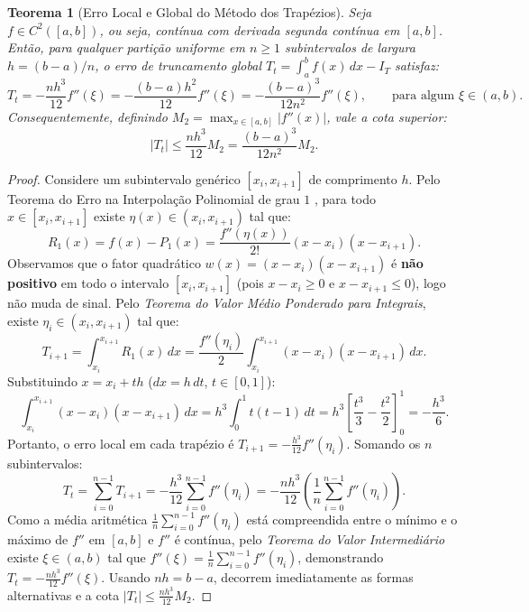 \documentclass[11pt,a4paper]{article}
\newtheorem{teorema}{Teorema}[section]
\begin{document}
\begin{teorema}[Erro Local e Global do Método dos Trapézios]
Seja $f \in C^2([a, b])$, ou seja, contínua com derivada segunda contínua em $[a, b]$. Então, para qualquer partição uniforme em $n \ge 1$ subintervalos de largura $h = (b - a)/n$, o erro de truncamento global $T_t = \int_a^b f(x)\,dx - I_T$ satisfaz:
\begin{equation}
    T_t = -\frac{n h^3}{12} f''(\xi) = -\frac{(b - a) h^2}{12} f''(\xi) = -\frac{(b - a)^3}{12 n^2} f''(\xi), \qquad \text{para algum } \xi \in (a, b).
\end{equation}
Consequentemente, definindo $M_2 = \max_{x \in [a, b]} |f''(x)|$, vale a cota superior:
\begin{equation}
    |T_t| \le \frac{n h^3}{12} M_2 = \frac{(b - a)^3}{12 n^2} M_2.
\end{equation}
\end{teorema}

\begin{proof}
Considere um subintervalo genérico $[x_i, x_{i+1}]$ de comprimento $h$. Pelo Teorema do Erro na Interpolação Polinomial de grau $1$ \cite{burden2016, ruggiero1996}, para todo $x \in [x_i, x_{i+1}]$ existe $\eta(x) \in (x_i, x_{i+1})$ tal que:
\[
R_1(x) = f(x) - P_1(x) = \frac{f''(\eta(x))}{2!} (x - x_i)(x - x_{i+1}).
\]
Observamos que o fator quadrático $w(x) = (x - x_i)(x - x_{i+1})$ é \textbf{não positivo} em todo o intervalo $[x_i, x_{i+1}]$ (pois $x - x_i \ge 0$ e $x - x_{i+1} \le 0$), logo não muda de sinal. Pelo \emph{Teorema do Valor Médio Ponderado para Integrais}, existe $\eta_i \in (x_i, x_{i+1})$ tal que:
\[
T_{i+1} = \int_{x_i}^{x_{i+1}} R_1(x)\,dx = \frac{f''(\eta_i)}{2} \int_{x_i}^{x_{i+1}} (x - x_i)(x - x_{i+1})\,dx.
\]
Substituindo $x = x_i + t h$ ($dx = h\,dt$, $t \in [0, 1]$):
\[
\int_{x_i}^{x_{i+1}} (x - x_i)(x - x_{i+1})\,dx = h^3 \int_0^1 t(t - 1)\,dt = h^3 \left[\frac{t^3}{3} - \frac{t^2}{2}\right]_0^1 = -\frac{h^3}{6}.
\]
Portanto, o erro local em cada trapézio é $T_{i+1} = -\frac{h^3}{12} f''(\eta_i)$. Somando os $n$ subintervalos:
\[
T_t = \sum_{i=0}^{n-1} T_{i+1} = -\frac{h^3}{12} \sum_{i=0}^{n-1} f''(\eta_i) = -\frac{n h^3}{12} \left( \frac{1}{n} \sum_{i=0}^{n-1} f''(\eta_i) \right).
\]
Como a média aritmética $\frac{1}{n}\sum_{i=0}^{n-1} f''(\eta_i)$ está compreendida entre o mínimo e o máximo de $f''$ em $[a, b]$ e $f''$ é contínua, pelo \emph{Teorema do Valor Intermediário} existe $\xi \in (a, b)$ tal que $f''(\xi) = \frac{1}{n}\sum_{i=0}^{n-1} f''(\eta_i)$, demonstrando $T_t = -\frac{nh^3}{12} f''(\xi)$. Usando $nh = b - a$, decorrem imediatamente as formas alternativas e a cota $|T_t| \le \frac{nh^3}{12}M_2$.
\end{proof}
\end{document}
